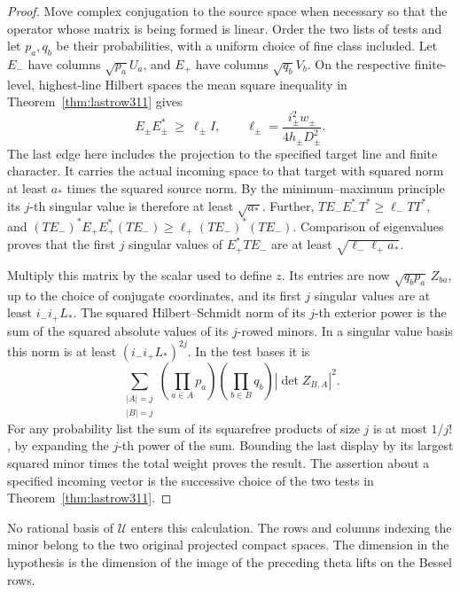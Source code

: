\documentclass[a4paper,11pt]{article}
\theoremstyle{definition}
\theoremstyle{remark}
\numberwithin{equation}{section}
\begin{document}
\begin{proof}
Move complex conjugation to the source space when necessary
so that the operator whose matrix is being formed is linear.
Order the two lists of tests and let \(p_a,q_b\) be their
probabilities, with a uniform choice of fine class included.
Let \(E_-\) have columns \(\sqrt{p_a}U_a\), and \(E_+\) have
columns \(\sqrt{q_b}V_b\). On the respective finite-level,
highest-line Hilbert spaces the mean square inequality in
Theorem~\ref{thm:lastrow311} gives
\[
        E_\pm E_\pm^*\ \ge\ \ell_\pm I,\qquad
        \ell_\pm=\frac{i_\pm^2 w_\pm}{4h_\pm D_\pm^2}.
\]
The last edge here includes the projection to the specified
target line and finite character. It carries the actual incoming
space to that target with squared norm at least \(a_*\) times
the squared source norm. By the minimum--maximum principle
its \(j\)-th singular value is therefore at least \(\sqrt{a_*}\).
Further,
\(TE_-E_-^*T^*\ge\ell_-TT^*\), and
\((TE_-)^*E_+E_+^*(TE_-)\ge\ell_+(TE_-)^*(TE_-)\).
Comparison of eigenvalues proves that the first \(j\) singular
values of \(E_+^*TE_-\) are at least
\(\sqrt{\ell_-\ell_+ a_*}\).

Multiply this matrix by the scalar used to define \(z\).
Its entries are now \(\sqrt{q_b p_a}\,Z_{ba}\), up to the
choice of conjugate coordinates, and its first \(j\) singular
values are at least \(i_-i_+L_*\). The squared Hilbert--Schmidt
norm of its \(j\)-th exterior power is the sum of the squared
absolute values of its \(j\)-rowed minors. In a singular value
basis this norm is at least \((i_-i_+L_*)^{2j}\). In the test
bases it is
\[
  \sum_{\substack{|A|=j\\ |B|=j}}
       \left(\prod_{a\in A}p_a\right)
       \left(\prod_{b\in B}q_b\right)
                      |\det Z_{B,A}|^2 .
\]
For any probability list the sum of its squarefree products
of size \(j\) is at most \(1/j!\), by expanding the \(j\)-th
power of the sum. Bounding the last display by its largest
squared minor times the total weight proves the result.
The assertion about a specified incoming vector is the
successive choice of the two tests in
Theorem~\ref{thm:lastrow311}.
\end{proof}

No rational basis of \(\mathcal U\) enters this calculation.
The rows and columns indexing the minor belong to the two
original projected compact spaces. The dimension in the
hypothesis is the dimension of the image of the preceding
theta lifts on the Bessel rows.
\end{document}
